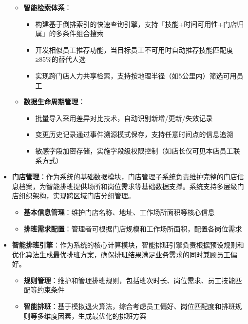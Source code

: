 \documentclass{ctexart}
\begin{document}
\begin{itemize}
\begin{itemize}
        \item \textbf{智能检索体系}：
            \begin{itemize}
                \item 构建基于倒排索引的快速查询引擎，支持「技能+时间可用性+门店归属」的多条件组合搜索
                \item 开发相似员工推荐功能，当目标员工不可用时自动推荐技能匹配度≥85\%的替代人选
                \item 实现跨门店人力共享检索，支持按地理半径（如5公里内）筛选可用员工
            \end{itemize}
        
        \item \textbf{数据生命周期管理}：
            \begin{itemize}
                \item 批量导入采用差异对比技术，自动识别新增/更新/失效记录
                \item 变更历史记录通过事件溯源模式保存，支持任意时间点的信息追溯
                \item 敏感字段加密存储，实施字段级权限控制（如店长仅可见本店员工联系方式）
            \end{itemize}
    \end{itemize}
    
    \item \textbf{门店管理}：作为系统的基础数据模块，门店管理子系统负责维护完整的门店信息档案，为智能排班提供场所和岗位需求等基础数据支撑。系统支持多层级门店组织架构，实现跨区域门店分组管理。
        \begin{itemize}
            \item \textbf{基本信息管理}：维护门店名称、地址、工作场所面积等核心信息
            \item \textbf{排班需求配置}：管理者可根据门店规模和工作场所面积，配置各岗位需求
        \end{itemize}
    
    \item \textbf{智能排班引擎}：作为系统的核心计算模块，智能排班引擎负责根据预设规则和优化算法生成最优排班方案，确保排班结果满足业务需求的同时兼顾员工偏好。
        \begin{itemize}
            \item \textbf{规则管理}：维护和管理排班规则，包括班次时长、岗位需求、员工技能匹配等约束条件
            \item \textbf{智能排班}：基于模拟退火算法，综合考虑员工偏好、岗位匹配度和排班规则等多维度因素，生成最优化的排班方案
        \end{itemize}
    

\end{itemize}
\end{document}

